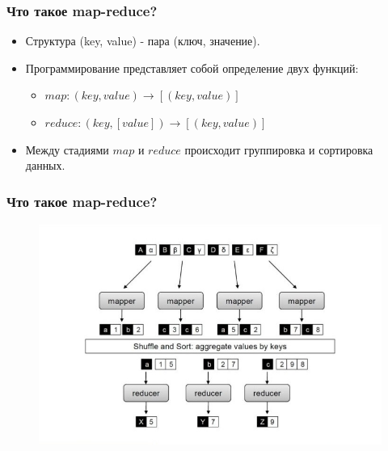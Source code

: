 \documentclass{beamer}
\begin{document}
    \begin{frame}
    \frametitle{Что такое map-reduce?}
        \begin{itemize}
            \item Структура (key, value) - пара (ключ, значение).
            \item Программирование представляет собой определение двух функций:
            \begin{itemize}
                \item $map: (key, value)\rightarrow[(key, value)]$
                \item $reduce: (key, [value])\rightarrow[(key, value)]$
            \end{itemize}
            \item Между стадиями $map$ и $reduce$ происходит группировка и сортировка данных.
            
        \end{itemize} 
    \end{frame}

    \begin{frame}
    \frametitle{Что такое map-reduce?}
        \begin{figure}[h!]
            \includegraphics[scale=0.4]{mapreduce_lite.jpg}
        \end{figure}
    \end{frame}
\end{document}
